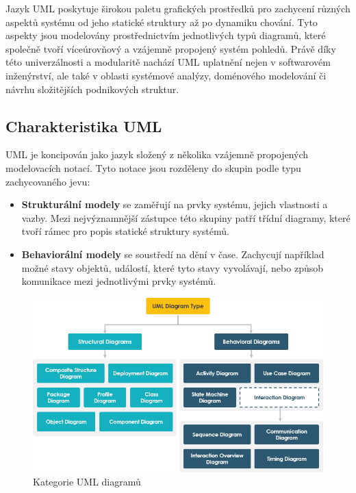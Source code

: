 Jazyk UML poskytuje širokou paletu grafických prostředků pro zachycení různých aspektů systému od jeho statické struktury až po dynamiku chování. Tyto aspekty jsou modelovány prostřednictvím jednotlivých typů diagramů, které společně tvoří víceúrovňový a vzájemně propojený systém pohledů. Právě díky této univerzálnosti a modularitě nachází UML uplatnění nejen v softwarovém inženýrství, ale také v oblasti systémové analýzy, doménového modelování či návrhu složitějších podnikových struktur. \cite{Engels2000}


\subsection{Charakteristika UML}
\label{sec:charakteristika-uml}
UML je koncipován jako jazyk složený z několika vzájemně propojených modelovacích notací. \cite{Engels2000} Tyto notace jsou rozděleny do skupin podle typu zachycovaného jevu:
\begin{itemize}
  \item \textbf{Strukturální modely} se zaměřují na prvky systému, jejich vlastnosti a vazby. Mezi nejvýznamnější zástupce této skupiny patří třídní diagramy, které tvoří rámec pro popis statické struktury systémů.
  \item \textbf{Behaviorální modely} se soustředí na dění v čase. Zachycují například možné stavy objektů, událostí, které tyto stavy vyvolávají, nebo způsob komunikace mezi jednotlivými prvky systémů. \cite{Selic2015semantic}
\end{itemize}

\begin{figure}[H]
  \centering
  \includegraphics[width=\textwidth]{images/uml_structural_behavioral.png}
  \caption{Kategorie UML diagramů \cite{visualparadigm}}
  \label{fig:uml_structural_behavioral}
\end{figure}

